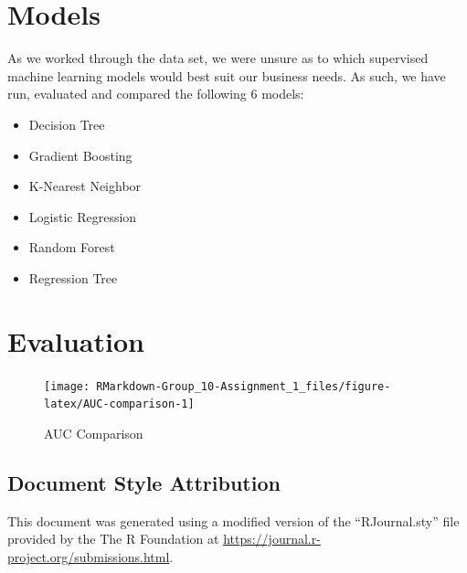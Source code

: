 \begin{Schunk}
\end{Schunk}

\hypertarget{models}{%
\section{Models}\label{models}}

As we worked through the data set, we were unsure as to which supervised
machine learning models would best suit our business needs. As such, we
have run, evaluated and compared the following 6 models:

\begin{itemize}
\tightlist
\item
  Decision Tree
\item
  Gradient Boosting
\item
  K-Nearest Neighbor
\item
  Logistic Regression
\item
  Random Forest
\item
  Regression Tree
\end{itemize}

\hypertarget{evaluation}{%
\section{Evaluation}\label{evaluation}}

\begin{Schunk}
\begin{figure}

{\centering \texttt{[image: RMarkdown-Group\_10-Assignment\_1\_files/figure-latex/AUC-comparison-1]} 

}

\caption[AUC Comparison]{AUC Comparison}\label{fig:AUC-comparison}
\end{figure}
\end{Schunk}

\hypertarget{document-style-attribution}{%
\subsection{Document Style
Attribution}\label{document-style-attribution}}

This document was generated using a modified version of the
``RJournal.sty'' file provided by the The R Foundation at
\url{https://journal.r-project.org/submissions.html}.

